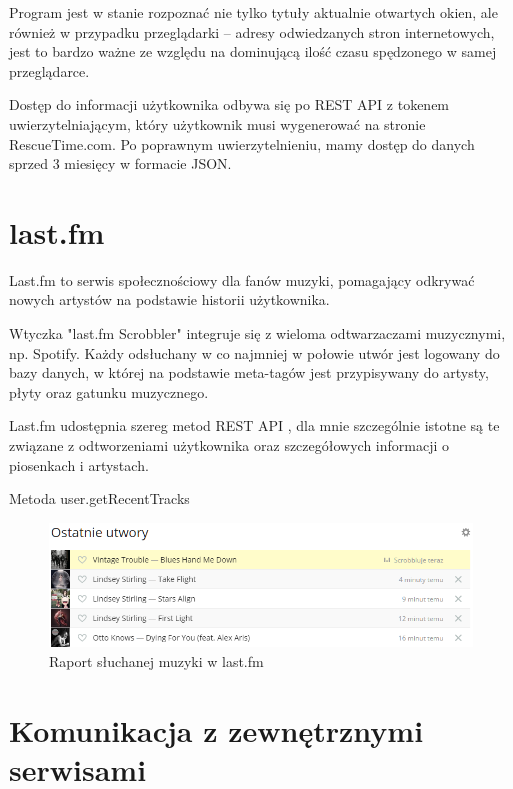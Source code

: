 \documentclass[brudnopis]{xmgr}
\begin{document}
        Program jest w stanie rozpoznać nie tylko tytuły aktualnie otwartych okien,
        ale również w przypadku przeglądarki – adresy odwiedzanych stron internetowych,
        jest to bardzo ważne ze względu na dominującą ilość czasu spędzonego w samej przeglądarce.

        Dostęp do informacji użytkownika odbywa się po REST API z tokenem uwierzytelniającym,
        który użytkownik musi wygenerować na stronie RescueTime.com.
        Po poprawnym uwierzytelnieniu, mamy dostęp do danych sprzed 3 miesięcy w formacie JSON.

        \section*{last.fm}

        Last.fm to serwis społecznościowy dla fanów muzyki,
        pomagający odkrywać nowych artystów na podstawie historii użytkownika.

        Wtyczka "last.fm Scrobbler"\cite{lastfm:trackmymusic} integruje się z wieloma odtwarzaczami muzycznymi, np. Spotify.
        Każdy odsłuchany w co najmniej w połowie utwór jest logowany do bazy danych,
        w której na podstawie meta-tagów jest przypisywany do artysty, płyty oraz gatunku muzycznego.

		 Last.fm udostępnia szereg metod REST API \cite{lastfm:apidoc}, 
		 dla mnie szczególnie istotne są te związane z odtworzeniami użytkownika oraz szczegółowych informacji o piosenkach i artystach.

		Metoda user.getRecentTracks %



        \begin{figure}
          \includegraphics[width=\linewidth]{fig/lastfm-now-listening.png}
          \caption{Raport słuchanej muzyki w last.fm}
          \label{fig:Last.fm}
        \end{figure}

        \section*{Komunikacja z zewnętrznymi serwisami}
\end{document}
